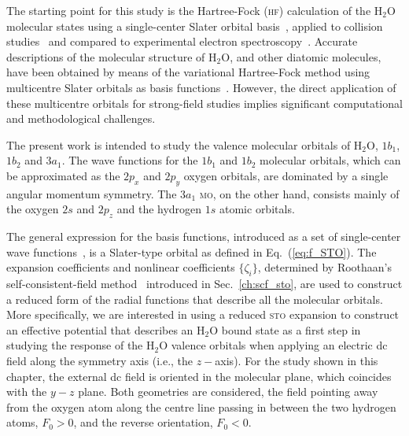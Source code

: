 The starting point for this study is the Hartree-Fock (\textsc{hf})
calculation of the H$_{2}$O molecular states using a single-center
Slater orbital
basis~\cite{Moccia_1964,Moccia_JCP_2164,Moccia_JCP_2176}, applied to
collision studies~\cite{Montanari_2013} and compared to experimental
electron spectroscopy~\cite{Hafied_2007}. Accurate descriptions of the
molecular structure of H$_{2}$O, and other diatomic molecules, have
been obtained by means of the variational Hartree-Fock method using
multicentre Slater orbitals as basis
functions~\cite{Pitzer_1968,Pitzer_1970}. However, the direct
application of these multicentre orbitals for strong-field studies
implies significant computational and methodological challenges.

The present work is intended to study the valence molecular orbitals
of H$_{2}$O, $1b_{1}$, $1b_{2}$ and $3a_{1}$. The wave functions for
the $1b_{1}$ and $1b_{2}$ molecular orbitals, which can be
approximated as the $2p_{x}$ and $2p_{y}$ oxygen orbitals, are
dominated by a single angular momentum symmetry. The $3a_{1}$
\textsc{mo}, on the other hand, consists mainly of the oxygen $2s$ and
$2p_{z}$ and the hydrogen $1s$ atomic orbitals.

The general expression for the basis functions, introduced as a set of
single-center wave
functions~\cite{Moccia_1964,Moccia_JCP_2164,Moccia_JCP_2176}, is a
Slater-type orbital as defined in Eq.~(\ref{eq:f_STO}). The expansion
coefficients and nonlinear coefficients $\{\zeta_{i}\}$, determined by
Roothaan's self-consistent-field
method~\cite{Moccia_1964,Roothaan_1951} introduced in
Sec.~\ref{ch:scf_sto}, are used to construct a reduced form of the
radial functions that describe all the molecular orbitals. More
specifically, we are interested in using a reduced \textsc{sto}
expansion to construct an effective potential that describes an
H$_{2}$O bound state as a first step in studying the response of the
H$_{2}$O valence orbitals when applying an electric dc field along the
symmetry axis (i.e., the $z-$axis). For the study shown in this
chapter, the external dc field is oriented in the molecular plane,
which coincides with the $y-z$ plane. Both geometries are considered,
the field pointing away from the oxygen atom along the centre line
passing in between the two hydrogen atoms, $F_{0} > 0$, and the
reverse orientation, $F_{0} < 0$.

